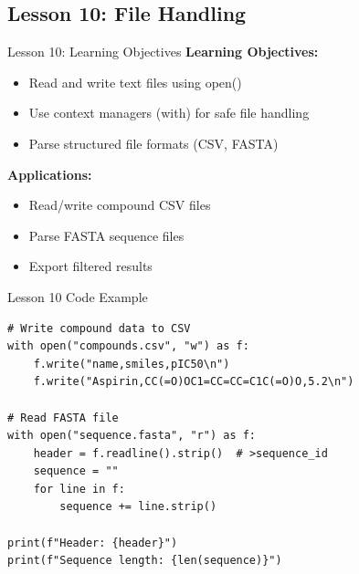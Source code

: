 \documentclass{beamer}
\begin{document}
\subsection{Lesson 10: File Handling}

\begin{frame}{Lesson 10: Learning Objectives}
    \small
    \textbf{Learning Objectives:}
    \begin{itemize}
        \item Read and write text files using open()
        \item Use context managers (with) for safe file handling
        \item Parse structured file formats (CSV, FASTA)
    \end{itemize}
    \vspace{0.5em}
    \textbf{Applications:}
    \begin{itemize}
        \item Read/write compound CSV files
        \item Parse FASTA sequence files
        \item Export filtered results
    \end{itemize}
\end{frame}

\begin{frame}[fragile]{Lesson 10 Code Example}
    \small
    \begin{lstlisting}[style=codeStyle]
# Write compound data to CSV
with open("compounds.csv", "w") as f:
    f.write("name,smiles,pIC50\n")
    f.write("Aspirin,CC(=O)OC1=CC=CC=C1C(=O)O,5.2\n")

# Read FASTA file
with open("sequence.fasta", "r") as f:
    header = f.readline().strip()  # >sequence_id
    sequence = ""
    for line in f:
        sequence += line.strip()

print(f"Header: {header}")
print(f"Sequence length: {len(sequence)}")
    \end{lstlisting}
\end{frame}
\end{document}
